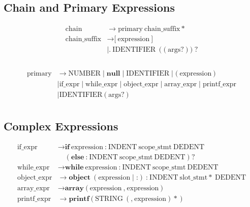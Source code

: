 \documentclass[12pt, a4paper]{article}
\begin{document}
\subsection{Chain and Primary Expressions}
\[
\begin{aligned}
\text{chain} &\rightarrow \text{primary}\ \text{chain\_suffix}* \\
\text{chain\_suffix} &\rightarrow \textbf{[}\ \text{expression}\ \textbf{]} \\
&\mid \textbf{.}\ \text{IDENTIFIER}\ (\textbf{(}\ \text{args}?\ \textbf{)})? \\
& \\
\end{aligned}
\]

\[
\begin{aligned}
\text{primary} &\rightarrow \text{NUMBER} \mid \textbf{null} \mid \text{IDENTIFIER} \mid \textbf{(}\ \text{expression}\ \textbf{)} \\
&\mid \text{if\_expr} \mid \text{while\_expr} \mid \text{object\_expr} \mid \text{array\_expr} \mid \text{printf\_expr} \\
&\mid  \text{IDENTIFIER}\ \textbf{(}\ \text{args}?\ \textbf{)} \\
\end{aligned}
\]

\subsection{Complex Expressions}
\[
\begin{aligned}
\text{if\_expr} &\rightarrow \textbf{if}\ \text{expression}\ \textbf{:}\ \text{INDENT}\ \text{scope\_stmt}\ \text{DEDENT} \\
&\quad (\textbf{else}\ \textbf{:}\ \text{INDENT}\ \text{scope\_stmt}\ \text{DEDENT})? \\
\text{while\_expr} &\rightarrow \textbf{while}\ \text{expression}\ \textbf{:}\ \text{INDENT}\ \text{scope\_stmt}\ \text{DEDENT} \\
\text{object\_expr} &\rightarrow \textbf{object}\ (\text{expression} \mid \textbf{:})\ \textbf{:}\ \text{INDENT}\ \text{slot\_stmt}*\ \text{DEDENT} \\
\text{array\_expr} &\rightarrow \textbf{array}\ \textbf{(}\ \text{expression}\ \textbf{,}\ \text{expression}\ \textbf{)} \\
\text{printf\_expr} &\rightarrow \textbf{printf}\ \textbf{(}\ \text{STRING}\ (\textbf{,}\ \text{expression})*\ \textbf{)}
\end{aligned}
\]
\end{document}
